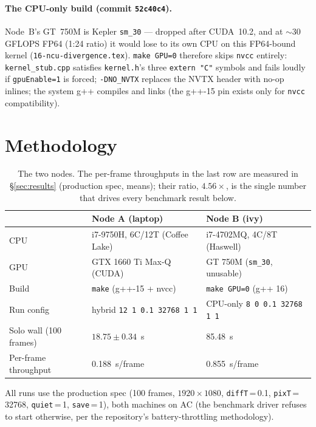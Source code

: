 \documentclass[
	english,
	letterpaper, oneside
]{article}
\begin{document}
\paragraph{The CPU-only build (commit \texttt{52c40c4}).} Node~B's GT~750M
is Kepler \texttt{sm\_30} --- dropped after CUDA~10.2, and at $\sim$30
GFLOPS FP64 (1:24 ratio) it would lose to its own CPU on this FP64-bound
kernel (\texttt{16-ncu-divergence.tex}). \texttt{make GPU=0} therefore
skips \texttt{nvcc} entirely: \texttt{kernel\_stub.cpp} satisfies
\texttt{kernel.h}'s three \texttt{extern "C"} symbols and fails loudly if
\texttt{gpuEnable=1} is forced; \texttt{-DNO\_NVTX} replaces the NVTX header
with no-op inlines; the system g++ compiles and links (the g++-15 pin exists
only for \texttt{nvcc} compatibility).

\section{Methodology}
\label{sec:method}

\begin{table}[H]
\centering
\caption{The two nodes. The per-frame throughputs in the last row are
measured in \S\ref{sec:results} (production spec, means); their ratio,
$4.56\times$, is the single number that drives every benchmark result
below.\label{tab:nodes}}
\begin{tabular}{lll}
\toprule
 & \textbf{Node A (laptop)} & \textbf{Node B (ivy)} \\
\midrule
CPU & i7-9750H, 6C/12T (Coffee Lake) & i7-4702MQ, 4C/8T (Haswell) \\
GPU & GTX 1660 Ti Max-Q (CUDA) & GT 750M (\texttt{sm\_30}, unusable) \\
Build & \texttt{make} (g++-15 + nvcc) & \texttt{make GPU=0} (g++ 16) \\
Run config & hybrid \texttt{12 1 0.1 32768 1 1} & CPU-only \texttt{8 0 0.1 32768 1 1} \\
Solo wall (100 frames) & $18.75\pm0.34$~s & 85.48~s \\
Per-frame throughput & 0.188~s/frame & 0.855~s/frame \\
\bottomrule
\end{tabular}
\end{table}

All runs use the production spec (100 frames, $1920\times1080$,
\texttt{diffT}\,=\,0.1, \texttt{pixT}\,=\,32768, \texttt{quiet}\,=\,1,
\texttt{save}\,=\,1), both machines on AC (the benchmark driver refuses to
start otherwise, per the repository's battery-throttling methodology).
\end{document}
